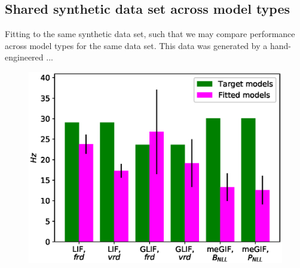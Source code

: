 




\subsection{Shared synthetic data set across model types}
Fitting to the same synthetic data set, such that we may compare performance across model types for the same data set. 
This data was generated by a hand-engineered ...

\begin{figure}
    \centering
	\includegraphics[width=0.49\columnwidth]{figures/export_rates_only_GT_all.eps}
\end{figure}





